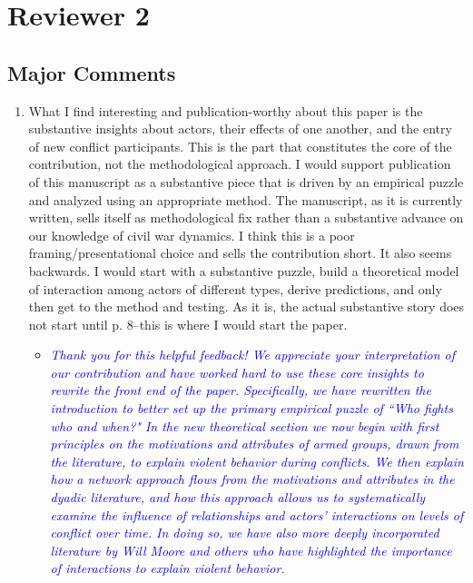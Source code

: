 \section{Reviewer 2}

\subsection{Major Comments}

\begin{enumerate}
	\item  What I find interesting and publication-worthy about this paper is the substantive insights about actors, their effects of one another, and the entry of new conflict participants. This is the part that constitutes the core of the contribution, not the methodological approach. I would support publication of this manuscript as a substantive piece that is driven by an empirical puzzle and analyzed using an appropriate method. The manuscript, as it is currently written, sells itself as methodological fix rather than a substantive advance on our knowledge of civil war dynamics. I think this is a poor framing/presentational choice and sells the contribution short. It also seems backwards.  I would start with a substantive puzzle, build a theoretical model of interaction among actors of different types, derive predictions, and only then get to the method and testing. As it is, the actual substantive story does not start until p. 8--this is where I would start the paper.
	\begin{itemize}
		\item \textcolor{blue}{ \emph{
		Thank you for this helpful feedback! We appreciate your interpretation of our contribution and have worked hard to use these core insights to rewrite the front end of the paper. Specifically, we have rewritten the introduction to better set up the primary empirical puzzle of ``Who fights who and when?" In the new theoretical section we now begin with first principles on the motivations and attributes of armed groups, drawn from the literature, to explain violent behavior during conflicts. We then explain how a network approach flows from the motivations and attributes in the dyadic literature, and how this approach allows us to systematically examine the influence of relationships and actors' interactions on levels of conflict over time. In doing so, we have also more deeply incorporated literature by Will Moore and others who have highlighted the importance of interactions to explain violent behavior. 
		}}
	\end{itemize}	

\end{enumerate}
